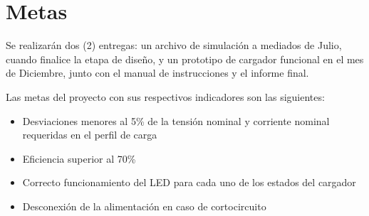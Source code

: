 \section{Metas}



Se realizarán dos (2) entregas: un archivo de simulación a mediados de Julio,
cuando finalice la etapa de diseño,
y un prototipo de cargador funcional en el mes de Diciembre,
junto con el manual de instrucciones y el informe final.

Las metas del proyecto con sus respectivos indicadores son las siguientes:

\begin{itemize}
    \item Desviaciones menores al 5\% de la tensión nominal y corriente nominal requeridas en el perfil de carga
    \item Eficiencia superior al 70\% %
    \item Correcto funcionamiento del LED para cada uno de los estados del cargador
    \item Desconexión de la alimentación en caso de cortocircuito
\end{itemize}
